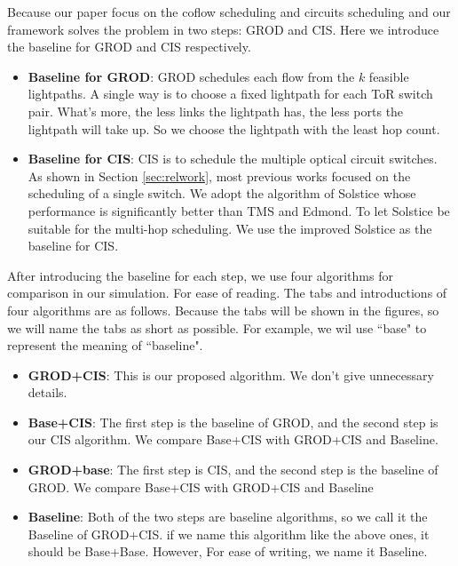 Because our paper focus on the coflow scheduling and circuits scheduling and our framework solves the problem in two steps: GROD and CIS. Here we introduce the baseline for GROD and CIS respectively.
\begin{itemize}
\item \textbf{Baseline for GROD}: GROD schedules each flow from the $k$ feasible lightpaths. A single way is to choose a fixed lightpath for each ToR switch pair. What's more, the less links the lightpath has, the less ports the lightpath will take up. So we choose the lightpath with the least hop count.
\item \textbf{Baseline for CIS}: CIS is to schedule the multiple optical circuit switches. As shown in Section \ref{sec:relwork}, most previous works focused on the scheduling of a single switch. We adopt the algorithm of Solstice \cite{liu2015scheduling} whose performance is significantly better than TMS and Edmond. To let Solstice be suitable for the multi-hop scheduling. We use the improved Solstice as the baseline for CIS.
\end{itemize}

After introducing the baseline for each step, we use four algorithms for comparison in our simulation. For ease of reading. The tabs and introductions of four algorithms are as follows. Because the tabs will be shown in the figures, so we will name the tabs as short as possible. For example, we wil use ``base" to represent the meaning of ``baseline".
\begin{itemize}
\item \textbf{GROD+CIS}: This is our proposed algorithm. We don't give unnecessary details.
\item \textbf{Base+CIS}: The first step is the baseline of GROD, and the second step is our CIS algorithm. We compare Base+CIS with GROD+CIS and Baseline.
\item \textbf{GROD+base}: The first step is CIS, and the second step is the baseline of GROD. We compare Base+CIS with GROD+CIS and Baseline
\item \textbf{Baseline}: Both of the two steps are baseline algorithms, so we call it the Baseline of GROD+CIS. if we name this algorithm like the above ones, it should be Base+Base. However, For ease of writing, we name it Baseline.
\end{itemize}



